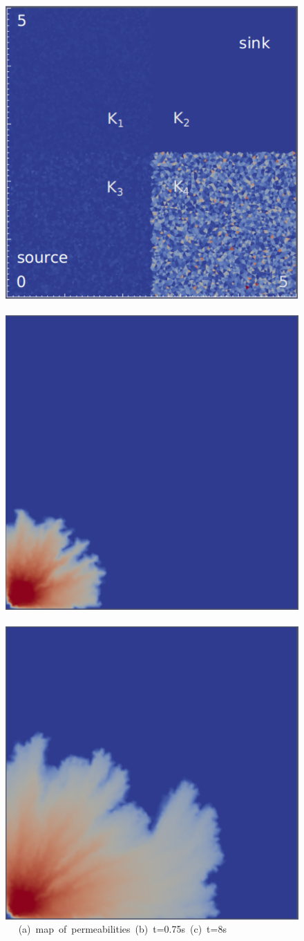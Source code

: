 \begin{landscape}
  \begin{figure}[ht]
  \vbox{\vspace{-1cm}
      \hbox{\includegraphics[width=.5\textwidth]{./Pics1/Saffman_heterogeneous/saffman_heter_fixed_1.pdf}
            \includegraphics[width=.5\textwidth]{./Pics1/Saffman_heterogeneous/saffman_heter_fixed_500.pdf} 
            \includegraphics[width=.5\textwidth]{./Pics1/Saffman_heterogeneous/saffman_heter_fixed_2000.pdf} }
      \hbox{\hspace{1.0cm} (a) map of permeabilities \hspace{3.cm} (b) t=0.75s \hspace{4.0cm} (c) t=8s}
}
\end{figure}
\end{landscape}
